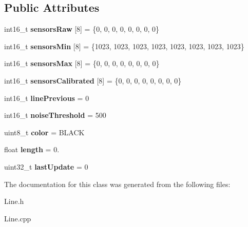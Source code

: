 \subsection*{Public Attributes}
\begin{DoxyCompactItemize}
\item 
\mbox{\label{class_line_aceb7cc67fdcf4817b0e69be4e5eb7a58}} 
int16\+\_\+t {\bfseries sensors\+Raw} \mbox{[}8\mbox{]} = \{0, 0, 0, 0, 0, 0, 0, 0\}
\item 
\mbox{\label{class_line_a3b2d5adf497cc8f3edfd7e9f1a87ca7b}} 
int16\+\_\+t {\bfseries sensors\+Min} \mbox{[}8\mbox{]} = \{1023, 1023, 1023, 1023, 1023, 1023, 1023, 1023\}
\item 
\mbox{\label{class_line_a4ca4bfe1fcd6875d958601cccc962f67}} 
int16\+\_\+t {\bfseries sensors\+Max} \mbox{[}8\mbox{]} = \{0, 0, 0, 0, 0, 0, 0, 0\}
\item 
\mbox{\label{class_line_a41c4aae2e20fe0bc940e377050f9c1e4}} 
int16\+\_\+t {\bfseries sensors\+Calibrated} \mbox{[}8\mbox{]} = \{0, 0, 0, 0, 0, 0, 0, 0\}
\item 
\mbox{\label{class_line_a2423d5a551bab0e39848d29b7bb11bb8}} 
int16\+\_\+t {\bfseries line\+Previous} = 0
\item 
\mbox{\label{class_line_a54341251a1179f8bc84563219ae6d990}} 
int16\+\_\+t {\bfseries noise\+Threshold} = 500
\item 
\mbox{\label{class_line_a6cc4affae8257c14534495d1b2de19ec}} 
uint8\+\_\+t {\bfseries color} = B\+L\+A\+CK
\item 
\mbox{\label{class_line_ab7e2334c25ca3ea59df0ef559bd88143}} 
float {\bfseries length} = 0.
\item 
\mbox{\label{class_line_a8059658253032d9bf1a9bb01a4883fc4}} 
uint32\+\_\+t {\bfseries last\+Update} = 0
\end{DoxyCompactItemize}


The documentation for this class was generated from the following files\+:\begin{DoxyCompactItemize}
\item 
Line.\+h\item 
Line.\+cpp\end{DoxyCompactItemize}

